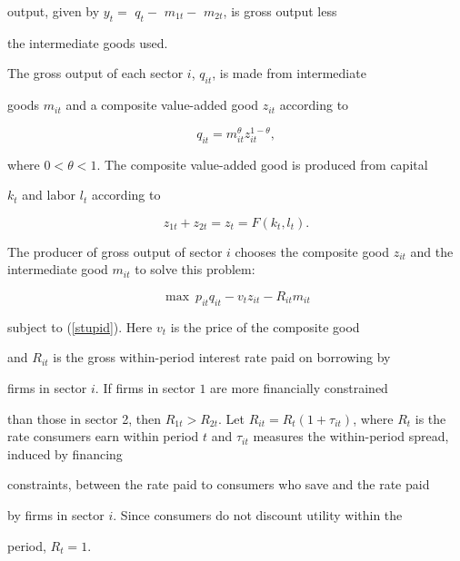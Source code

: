 \documentclass[fleqn,leqno,11pt]{article}
\begin{document}
output, given by $y_{t}=$ $q_{t}-$ $m_{1t}-$ $m_{2t}$, is gross output less

the intermediate goods used.



The gross output of each sector $i$, $q_{it}$, is made from intermediate

goods $m_{it}$ and a composite value-added good $z_{it}$ according to 

\begin{equation}

q_{it}=m_{it}^{\theta }z_{it}^{1-\theta },  \label{stupid}

\end{equation}

where $0<\theta <1.$ The composite value-added good is produced from capital 

$k_{t}$ and labor $l_{t}$ according to 

\begin{equation}

z_{1t}+z_{2t}=z_{t}=F(k_{t},l_{t}).  \label{z}

\end{equation}



The producer of gross output of sector $i$ chooses the composite good $%

z_{it} $ and the intermediate good $m_{it}$ to solve this problem: 

\[

\max \ p_{it}q_{it}-v_{t}z_{it}-R_{it}m_{it} 

\]

subject to (\ref{stupid}). Here $v_{t}$ is the price of the composite good

and $R_{it}$ is the gross within-period interest rate paid on borrowing by

firms in sector $i.$ If firms in sector $1$ are more financially constrained

than those in sector 2, then $R_{1t}>R_{2t}.$ Let $R_{it}=R_{t}(1+\tau

_{it}) $, where $R_{t}$ is the rate consumers earn within period $t$ and $%

\tau _{it} $ measures the within-period spread, induced by financing

constraints, between the rate paid to consumers who save and the rate paid

by firms in sector $i$. Since consumers do not discount utility within the

period, $R_{t}=1.$
\end{document}
